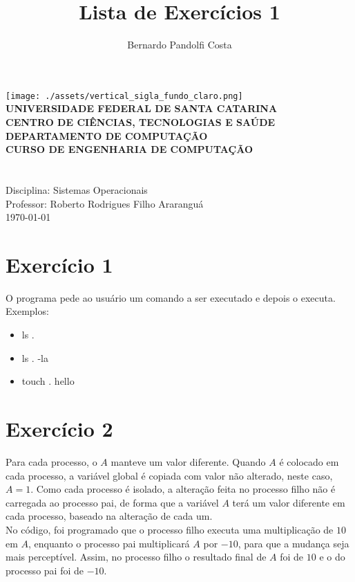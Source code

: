 \documentclass[a4paper,12pt]{article}
\author{Bernardo Pandolfi Costa}
\title{Lista de Exercícios 1}
\begin{document}
\makeatletter
\begin{titlepage}
    \begin{center}
    \texttt{[image: ./assets/vertical\_sigla\_fundo\_claro.png]}\\
        \small
        \vspace{0.25cm}
        \textbf{UNIVERSIDADE FEDERAL DE SANTA CATARINA}\\
		\textbf{CENTRO DE CIÊNCIAS, TECNOLOGIAS E SAÚDE}\\
		\textbf{DEPARTAMENTO DE COMPUTAÇÃO}\\
		\textbf{CURSO DE ENGENHARIA DE COMPUTAÇÃO}\\
        \vspace{7cm}
        \Large
        \textbf{\@title}\\
        \vspace{0.5cm}
        \normalsize
        \textbf{\@author}\\
        \vspace{1.5cm}
        \small
        Disciplina: Sistemas Operacionais\\
        Professor: Roberto Rodrigues Filho
        \vfill
        Araranguá\\
        \today
    \end{center}
\end{titlepage}
\makeatother

\tableofcontents
\newpage

\section{Exercício 1}
O programa pede ao usuário um comando a ser executado e depois o executa.\\
Exemplos: 
\begin{itemize}
\item ls .
\item ls . -la
\item touch . hello
\end{itemize}

\section{Exercício 2}
Para cada processo, o $A$ manteve um valor diferente. Quando $A$ é colocado em cada processo, a variável global é copiada com valor não alterado, neste caso, $A = 1$. Como cada processo é isolado, a alteração feita no processo filho não é carregada ao processo pai, de forma que a variável $A$ terá um valor diferente em cada processo, baseado na alteração de cada um.\\
No código, foi programado que o processo filho executa uma multiplicação de $10$ em $A$, enquanto o processo pai multiplicará $A$ por $-10$, para que a mudança seja mais perceptível. Assim, no processo filho o resultado final de $A$ foi de $10$ e o do processo pai foi de $-10$.
\end{document}
